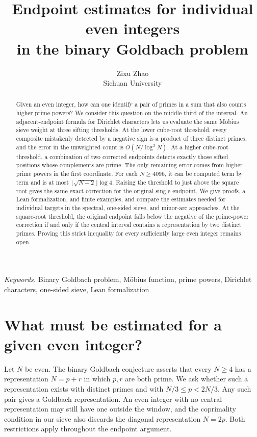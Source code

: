 \documentclass[11pt,a4paper]{article}
\title{Endpoint estimates for individual even integers\\in the binary Goldbach problem}
\author{Zixu Zhao\\[2pt]\small Sichuan University}
\date{}
\begin{document}
\maketitle

\begin{abstract}

Given an even integer, how can one identify a pair of primes in a sum that also counts higher prime powers? We consider this question on the middle third of the interval. An adjacent-endpoint formula for Dirichlet characters lets us evaluate the same Möbius sieve weight at three sifting thresholds. At the lower cube-root threshold, every composite mistakenly detected by a negative sign is a product of three distinct primes, and the error in the unweighted count is $O(N/\log^3 N)$. At a higher cube-root threshold, a combination of two corrected endpoints detects exactly those sifted positions whose complements are prime. The only remaining error comes from higher prime powers in the first coordinate. For each $N\ge4096$, it can be computed term by term and is at most $\lfloor\sqrt{N-2}\rfloor\log 4$. Raising the threshold to just above the square root gives the same exact correction for the original single endpoint. We give proofs, a Lean formalization, and finite examples, and compare the estimates needed for individual targets in the spectral, one-sided sieve, and minor-arc approaches. At the square-root threshold, the original endpoint falls below the negative of the prime-power correction if and only if the central interval contains a representation by two distinct primes. Proving this strict inequality for every sufficiently large even integer remains open.

\end{abstract}

\noindent\textit{Keywords.} Binary Goldbach problem, Möbius function, prime powers, Dirichlet characters, one-sided sieve, Lean formalization

\section{What must be estimated for a given even integer?}

Let $N$ be even. The binary Goldbach conjecture asserts that every $N\ge4$ has a representation $N=p+r$ in which $p,r$ are both prime. We ask whether such a representation exists with distinct primes and with $N/3\le p<2N/3$. Any such pair gives a Goldbach representation. An even integer with no central representation may still have one outside the window, and the coprimality condition in our sieve also discards the diagonal representation $N=2p$. Both restrictions apply throughout the endpoint argument.
\end{document}
